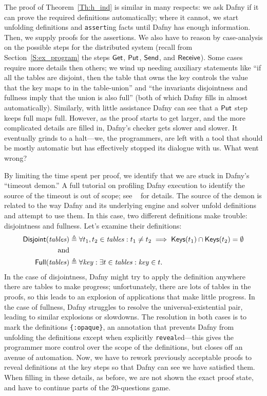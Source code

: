 The proof of Theorem~\ref{Th:h_ind} is similar in many respects: we ask Dafny if
it can prove the required definitions automatically; where it cannot, we start
unfolding definitions and \texttt{assert}ing facts until Dafny has enough
information. Then, we supply proofs for the assertions. We also have to reason
by case-analysis on the possible steps for the distributed system (recall from
Section~\ref{S:ex_program} the steps \(\mathsf{Get}\), \(\mathsf{Put}\),
\(\mathsf{Send}\), and \(\mathsf{Receive}\)). Some cases require more details then
others; we wind up needing auxiliary statements like ``if all the tables are
disjoint, then the table that owns the key controls the value that the key maps
to in the table-union'' and ``the invariants disjointness and fullness imply
that the union is also full'' (both of which Dafny fills in almost
automatically). Similarly, with little assistance Dafny can see that a
\(\mathsf{Put}\) step keeps full maps full. However, as the proof starts to get
larger, and the more complicated details are filled in, Dafny's checker gets
slower and slower. It eventually grinds to a halt---we, the programmers, are
left with a tool that should be mostly automatic but has effectively stopped its
dialogue with us. What went wrong?

By limiting the time spent per proof, we identify that we are stuck in Dafny's
``timeout demon.'' A full tutorial on profiling Dafny execution to identify the
source of the timeout is out of scope; see
\citeauthor{Kapritsos_2020}~\cite{Kapritsos_2020} for details. The source of the
demon is related to the way Dafny and its underlying engine and solver unfold
definitions and attempt to use them. In this case, two different definitions
make trouble: disjointness and fullness. Let's examine their definitions:
\begin{align*}
    \mathsf{Disjoint}(\mathit{tables}) &\triangleq \forall t_1, t_2 \in \mathit{tables}:
    t_1 \neq t_2 \implies \mathsf{Keys}(t_1) \cap \mathsf{Keys}(t_2) = \emptyset
    \\ \text{and} \\
    \mathsf{Full}(\mathit{tables}) &\triangleq \forall \mathit{key} : \exists t \in
    \mathit{tables} : \mathit{key} \in t.
\end{align*}
In the case of disjointness, Dafny might try to apply the definition anywhere
there are tables to make progress; unfortunately, there are lots of tables in
the proofs, so this leads to an explosion of applications that make little
progress. In the case of fullness, Dafny struggles to resolve the
universal-existential pair, leading to similar explosions or slowdowns. The
resolution in both cases is to mark the definitions \texttt{\{:opaque\}}, an
annotation that prevents Dafny from unfolding the definitions except when
explicitly \texttt{reveal}ed---this gives the programmer more control over the
scope of the definitions, but closes off an avenue of automation. Now, we have to
rework previously acceptable proofs to reveal definitions at the key steps so
that Dafny can see we have satisfied them. When filling in these details, as
before, we are not shown the exact proof state, and have to continue parts of the
20-questions game.


